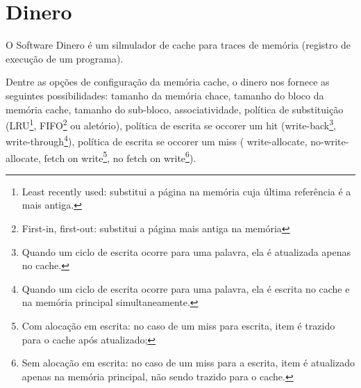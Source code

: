 \documentclass[12pt,a4paper]{article}
\begin{document}

\section{Dinero}


O Software Dinero é um silmulador de cache para traces de memória
(registro de execução de um programa).

Dentre as opções de configuração da memória cache, o dinero nos
fornece as seguintes possibilidades:
tamanho da memória chace, tamanho do bloco da memória
cache, tamanho do sub-bloco, associatividade, política de
substituição (LRU\footnote{Least recently used: substitui a página na memória cuja última referência é a mais antiga.
}, FIFO\footnote{First-in, first-out: substitui a página mais antiga na memória} ou aletório), política de escrita se occorer um hit (write-back\footnote{Quando um ciclo de escrita ocorre para uma palavra, ela é atualizada
apenas no cache.}, write-through\footnote{Quando um ciclo de escrita ocorre para uma palavra, ela é escrita
no cache e na memória principal simultaneamente.}), política de escrita se occorer um
miss ( write-allocate, no-write-allocate, fetch on write\footnote{Com
  alocação em escrita: no caso de um miss para escrita, item é trazido
  para o cache após atualizado;}, no fetch on write\footnote{Sem
  alocação em escrita: no caso de um miss para a  escrita, item é
  atualizado apenas na memória principal, não sendo trazido para o cache.}).

\end{document}
